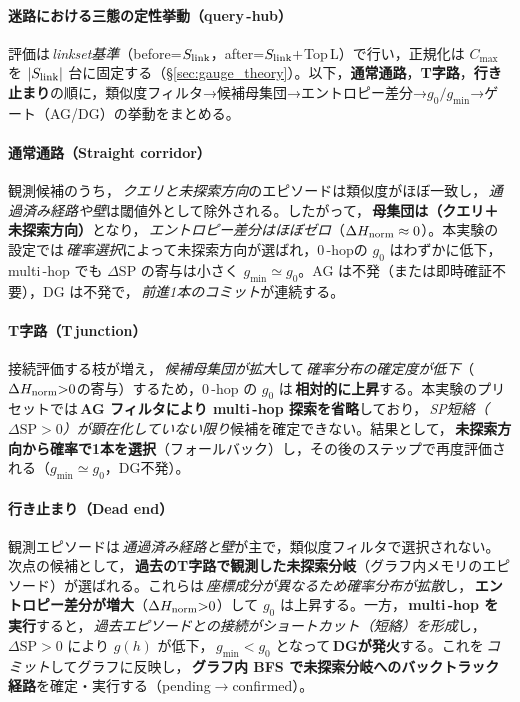 \documentclass[ja=standard,xelatex]{bxjsarticle}
\begin{document}
\paragraph{迷路における三態の定性挙動（query\,\mbox{-}hub）}
評価は\,\emph{linkset基準}（before=$S_{\rm link}$，after=$S_{\rm link}{+}$Top\,L）で行い，正規化は $C_{\max}$ を $|S_{\rm link}|$ 台に固定する（§\ref{sec:gauge_theory}）。以下，\textbf{通常通路}，\textbf{T字路}，\textbf{行き止まり}の順に，類似度フィルタ→候補母集団→エントロピー差分→$g_0/g_{\min}$→ゲート（AG/DG）の挙動をまとめる。

\paragraph{通常通路（Straight corridor）}
観測候補のうち，\,\emph{クエリと未探索方向}のエピソードは類似度がほぼ一致し，\,\emph{通過済み経路や壁}は閾値外として除外される。したがって，\,\textbf{母集団は（クエリ＋未探索方向）}となり，\,\emph{エントロピー差分はほぼゼロ}（$\Delta H_{\rm norm}\approx 0$）。本実験の設定では\,\emph{確率選択}によって未探索方向が選ばれ，0\,\mbox{-}hopの $g_0$ はわずかに低下，multi\,\mbox{-}hop でも $\Delta\mathrm{SP}$ の寄与は小さく $g_{\min}\simeq g_0$。AG は不発（または即時確証不要），DG は不発で，\,\emph{前進1本のコミット}が連続する。

\paragraph{T字路（T\,junction）}
接続評価する枝が増え，\,\emph{候補母集団が拡大}して\,\emph{確率分布の確定度が低下}（$\Delta H_{\rm norm}{>}0$の寄与）するため，0\,\mbox{-}hop の $g_0$ は\,\textbf{相対的に上昇}する。本実験のプリセットでは\,\textbf{AG フィルタにより multi\,\mbox{-}hop 探索を省略}しており，\,\emph{SP短絡（$\Delta\mathrm{SP}{>}0$）が顕在化していない限り}候補を確定できない。結果として，\,\textbf{未探索方向から確率で1本を選択}（フォールバック）し，その後のステップで再度評価される（$g_{\min}{\simeq}g_0$，DG不発）。

\paragraph{行き止まり（Dead end）}
観測エピソードは\,\emph{通過済み経路と壁}が主で，類似度フィルタで選択されない。次点の候補として，\,\textbf{過去のT字路で観測した未探索分岐}（グラフ内メモリのエピソード）が選ばれる。これらは\,\emph{座標成分が異なるため確率分布が拡散}し，\,\textbf{エントロピー差分が増大}（$\Delta H_{\rm norm}{>}0$）して $g_0$ は上昇する。一方，\,\textbf{multi\,\mbox{-}hop を実行}すると，\,\emph{過去エピソードとの接続がショートカット（短絡）を形成}し，\,$\Delta\mathrm{SP}{>}0$ により $g(h)$ が低下，\,$g_{\min}{<}g_0$ となって\,\textbf{DGが発火}する。これを\,\emph{コミット}してグラフに反映し，\,\textbf{グラフ内 BFS で未探索分岐へのバックトラック経路}を確定・実行する（pending$\to$confirmed）。
\end{document}
